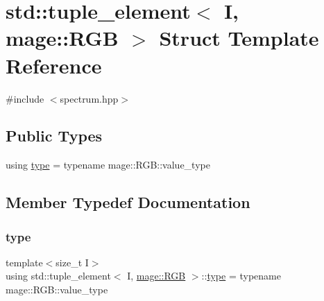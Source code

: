 \hypertarget{structstd_1_1tuple__element_3_01_i_00_01mage_1_1_r_g_b_01_4}{}\section{std\+:\+:tuple\+\_\+element$<$ I, mage\+:\+:R\+GB $>$ Struct Template Reference}
\label{structstd_1_1tuple__element_3_01_i_00_01mage_1_1_r_g_b_01_4}


{\ttfamily \#include $<$spectrum.\+hpp$>$}

\subsection*{Public Types}
\begin{DoxyCompactItemize}
\item 
using \mbox{\hyperlink{structstd_1_1tuple__element_3_01_i_00_01mage_1_1_r_g_b_01_4_ad0224ad81727664636c99c365d17b2c7}{type}} = typename mage\+::\+R\+G\+B\+::value\+\_\+type
\end{DoxyCompactItemize}


\subsection{Member Typedef Documentation}
\mbox{\label{structstd_1_1tuple__element_3_01_i_00_01mage_1_1_r_g_b_01_4_ad0224ad81727664636c99c365d17b2c7}} 
\subsubsection{\texorpdfstring{type}{type}}
{\footnotesize\ttfamily template$<$size\+\_\+t I$>$ \\
using std\+::tuple\+\_\+element$<$ I, \mbox{\hyperlink{structmage_1_1_r_g_b}{mage\+::\+R\+GB}} $>$\+::\mbox{\hyperlink{structstd_1_1tuple__element_3_01_i_00_01mage_1_1_r_g_b_01_4_ad0224ad81727664636c99c365d17b2c7}{type}} =  typename mage\+::\+R\+G\+B\+::value\+\_\+type}

